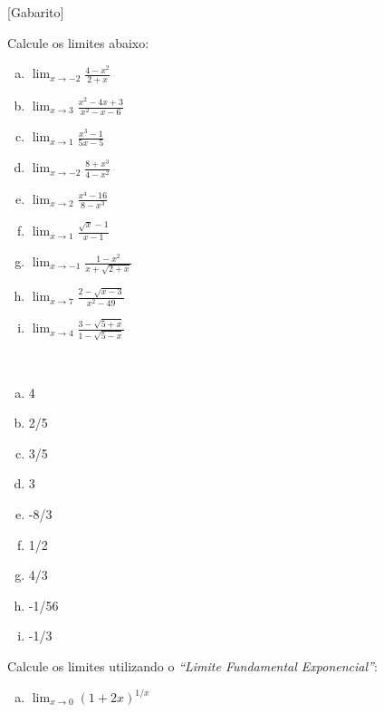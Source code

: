 \documentclass[a4paper, 12pt, addpoints]{exam}
\begin{document}
\info\vspace{-1 cm} %
[Gabarito] 
\begin{questions}%
\question Calcule os limites abaixo:
\begin{multicols}{3}
\begin{enumerate}[a)]
\item  $\lim _{x \rightarrow-2} \frac{4-x^{2}}{2+x}$
\item $\lim _{x \rightarrow 3} \frac{x^{2}-4 x+3}{x^{2}-x-6}$
\item $\lim _{x \rightarrow 1} \frac{x^{3}-1}{5 x-5}$
\item $\lim _{x \rightarrow-2} \frac{8+x^{3}}{4-x^{2}}$
\item $\lim _{x \rightarrow 2} \frac{x^{4}-16}{8-x^{3}}$
\item $\lim _{x \rightarrow 1} \frac{\sqrt{x}-1}{x-1}$
\item $\lim _{x \rightarrow-1} \frac{1-x^{2}}{x+\sqrt{2+x}}$
\item $\lim _{x \rightarrow 7} \frac{2-\sqrt{x-3}}{x^{2}-49}$
\item $\lim _{x \rightarrow 4} \frac{3-\sqrt{5+x}}{1-\sqrt{5-x}}$
\end{enumerate}
\end{multicols}
\begin{resp}~
\begin{multicols}{5}
\begin{enumerate}[a)]
\item 4
\item 2/5
\item 3/5
\item 3
\item -8/3
\item 1/2
\item 4/3
\item -1/56
\item -1/3
\end{enumerate}
\end{multicols}
\end{resp}
\question  Calcule os limites utilizando o \textit{``Limite Fundamental Exponencial''}:
\begin{multicols}{3}
\begin{enumerate}[a)]
\item $\lim _{x \rightarrow 0}(1+2 x)^{1 / x}$

\end{enumerate}
\end{multicols}
\end{questions}
\end{document}
